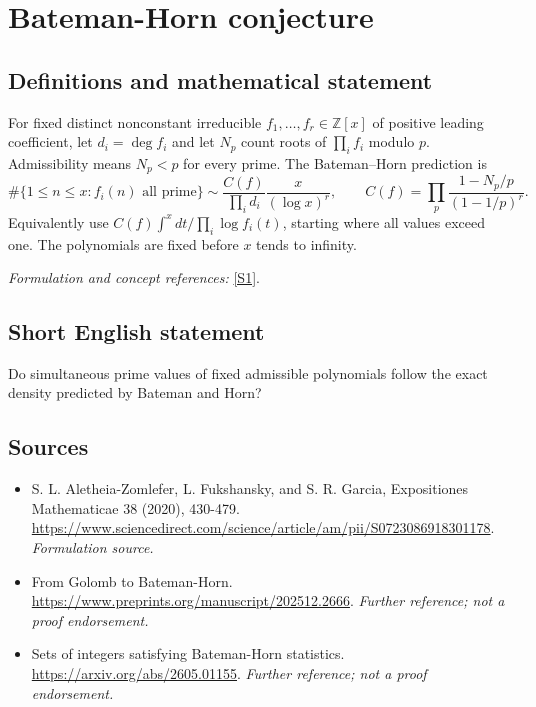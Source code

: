 \documentclass[11pt]{article}
\begin{document}
\section*{\texorpdfstring{Bateman-Horn conjecture}{Bateman-Horn conjecture}}\label{83}
\subsection{Definitions and mathematical statement}
For fixed distinct nonconstant irreducible $f_1,\ldots,f_r\in{\mathbb{Z}}[x]$ of positive leading coefficient, let $d_i=\deg f_i$ and let $N_p$ count roots of $\prod_i f_i$ modulo $p$. Admissibility means $N_p<p$ for every prime. The Bateman--Horn prediction is
\[
 \#\{1\le n\le x:f_i(n)\text{ all prime}\}
 \sim\frac{C(f)}{\prod_i d_i}\frac{x}{(\log x)^r},\qquad
 C(f)=\prod_p\frac{1-N_p/p}{(1-1/p)^r}.
\]
Equivalently use $C(f)\int^x dt/\prod_i\log f_i(t)$, starting where all values exceed one. The polynomials are fixed before $x$ tends to infinity.
\par\smallskip\textit{Formulation and concept references:} \href{https://www.sciencedirect.com/science/article/am/pii/S0723086918301178}{[S1]}.

\subsection{Short English statement}
Do simultaneous prime values of fixed admissible polynomials follow the exact density predicted by Bateman and Horn?
\subsection{Sources}
\begin{itemize}
\item[S1]S. L. Aletheia-Zomlefer, L. Fukshansky, and S. R. Garcia, Expositiones Mathematicae 38 (2020), 430-479.
\url{https://www.sciencedirect.com/science/article/am/pii/S0723086918301178}.
\textit{Formulation source.}
\item[S2]From Golomb to Bateman-Horn.
\url{https://www.preprints.org/manuscript/202512.2666}.
\textit{Further reference; not a proof endorsement.}
\item[S3]Sets of integers satisfying Bateman-Horn statistics.
\url{https://arxiv.org/abs/2605.01155}.
\textit{Further reference; not a proof endorsement.}
\end{itemize}
\end{document}
